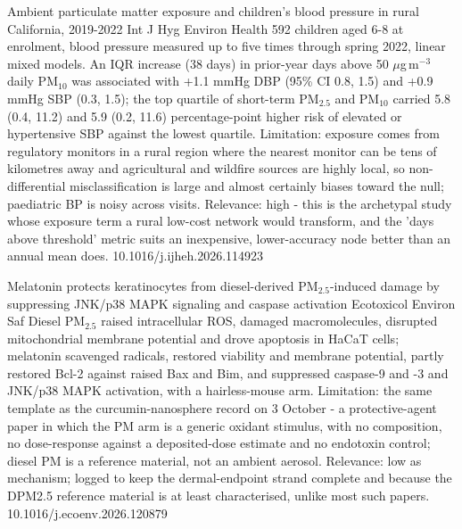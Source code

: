 \documentclass[10pt]{article}
\begin{document}
{Ambient particulate matter exposure and children's blood pressure in rural California, 2019-2022}
{Int J Hyg Environ Health}
{592 children aged 6-8 at enrolment, blood pressure measured up to five times through spring 2022, linear mixed models. An IQR increase (38 days) in prior-year days above 50 $\mu$g\,m$^{-3}$ daily PM$_{10}$ was associated with +1.1 mmHg DBP (95\% CI 0.8, 1.5) and +0.9 mmHg SBP (0.3, 1.5); the top quartile of short-term PM$_{2.5}$ and PM$_{10}$ carried 5.8 (0.4, 11.2) and 5.9 (0.2, 11.6) percentage-point higher risk of elevated or hypertensive SBP against the lowest quartile. Limitation: exposure comes from regulatory monitors in a rural region where the nearest monitor can be tens of kilometres away and agricultural and wildfire sources are highly local, so non-differential misclassification is large and almost certainly biases toward the null; paediatric BP is noisy across visits. Relevance: high - this is the archetypal study whose exposure term a rural low-cost network would transform, and the 'days above threshold' metric suits an inexpensive, lower-accuracy node better than an annual mean does.}
{10.1016/j.ijheh.2026.114923}

\par{}\baselineskip{}\baselineskip
{}

{Melatonin protects keratinocytes from diesel-derived PM$_{2.5}$-induced damage by suppressing JNK/p38 MAPK signaling and caspase activation}
{Ecotoxicol Environ Saf}
{Diesel PM$_{2.5}$ raised intracellular ROS, damaged macromolecules, disrupted mitochondrial membrane potential and drove apoptosis in HaCaT cells; melatonin scavenged radicals, restored viability and membrane potential, partly restored Bcl-2 against raised Bax and Bim, and suppressed caspase-9 and -3 and JNK/p38 MAPK activation, with a hairless-mouse arm. Limitation: the same template as the curcumin-nanosphere record on 3 October - a protective-agent paper in which the PM arm is a generic oxidant stimulus, with no composition, no dose-response against a deposited-dose estimate and no endotoxin control; diesel PM is a reference material, not an ambient aerosol. Relevance: low as mechanism; logged to keep the dermal-endpoint strand complete and because the DPM2.5 reference material is at least characterised, unlike most such papers.}
{10.1016/j.ecoenv.2026.120879}
\end{document}
